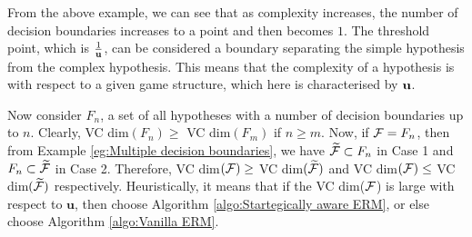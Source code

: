 From the above example, we can see that as complexity increases, the number of decision boundaries increases to a point and then becomes $1$. The threshold point, which is $\frac{1}{\mathbf{u}}$, can be considered a boundary separating the simple hypothesis from the complex hypothesis. This means that the complexity of a hypothesis is with respect to a given game structure, which here is characterised by $\mathbf{u}$.

Now consider $F_n$, a set of all hypotheses with a number of decision boundaries up to $n$. Clearly, VC dim$(F_n) \geq $ VC dim$(F_m)$ if $n \geq m$. Now, if $\mathcal{F} = F_n$, then from Example \ref{eg:Multiple decision boundaries}, we have $\widetilde{\mathcal{F}} \subset F_n$ in Case 1 and $F_n \subset \widetilde{\mathcal{F}}$ in Case 2. Therefore, VC dim$(\mathcal{F}) \geq$ VC dim$(\widetilde{\mathcal{F}})$ and VC dim$(\mathcal{F}) \leq$ VC dim$(\widetilde{\mathcal{F}})$ respectively. Heuristically, it means that if the VC dim($\mathcal{F}$) is large with respect to $\mathbf{u}$, then choose Algorithm \ref{algo:Startegically aware ERM}, or else choose Algorithm \ref{algo:Vanilla ERM}.





